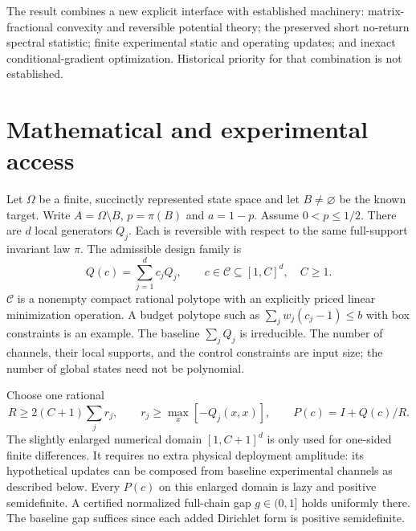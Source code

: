 \documentclass[11pt]{article}
\newcommand{\calC}{\mathcal C}
\begin{document}
The result combines a new explicit interface with established machinery:
matrix-fractional convexity and reversible potential theory; the preserved
short no-return spectral statistic; finite experimental static and
operating updates; and inexact conditional-gradient optimization.
Historical priority for that combination is not established.

\section{Mathematical and experimental access}
\label{sec:access}
Let $\Omega$ be a finite, succinctly represented state space and let
$B\ne\varnothing$ be the known target. Write $A=\Omega\setminus B$,
$p=\pi(B)$ and $a=1-p$. Assume $0<p\le1/2$.
There are $d$ local generators $Q_j$. Each is reversible with respect to
the same full-support invariant law $\pi$. The admissible design family is
\begin{equation}
 Q(c)=\sum_{j=1}^d c_jQ_j,\qquad c\in\calC\subseteq[1,C]^d,\quad C\ge1.
 \label{eq:family}
\end{equation}
$\calC$ is a nonempty compact rational polytope with an explicitly priced
linear minimization operation. A budget polytope such as
$\sum_j w_j(c_j-1)\le b$ with box constraints is an example.
The baseline $\sum_jQ_j$ is irreducible. The number of channels, their
local supports, and the control constraints are input size; the number
of global states need not be polynomial.

Choose one rational
\[
 R\ge 2(C+1)\sum_j r_j,\qquad
 r_j\ge\max_x[-Q_j(x,x)],\qquad P(c)=I+Q(c)/R.
\]
The slightly enlarged numerical domain $[1,C+1]^d$ is only used for
one-sided finite differences. It requires no extra physical deployment
amplitude: its hypothetical updates can be composed from baseline
experimental channels as described below. Every $P(c)$ on this enlarged
domain is lazy and positive semidefinite. A certified normalized full-chain
gap $g\in(0,1]$ holds uniformly there. The baseline gap suffices since
each added Dirichlet form is positive semidefinite.
\end{document}
